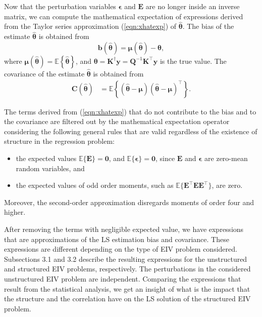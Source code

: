 Now that the perturbation variables $\bm{\epsilon}$ and $\mathbf{E}$ are no longer inside an inverse matrix, we can compute the mathematical expectation of expressions derived from the Taylor series approximation (\ref{eqn:xhatexp}) of $\widehat{\bm{\theta}}$. 
The bias of the estimate $\widehat{\bm{\theta}}$ is obtained from
\begin{equation} \mathbf{b} \left(\widehat{\bm{\theta}} \right) = \bm{\mu}\left(\widehat{\bm{\theta}} \right) - \bm{\theta}, \label{eqn:biasdef} \end{equation}
where $\bm{\mu} \left(\widehat{\bm{\theta}} \right) = \mathbb{E} \left\{ \widehat{\bm{\theta}} \right\}$, and $\bm{\theta} = \mathbf{K}^\dagger \mathbf{y} = \mathbf{Q}^{-1} \mathbf{K}^\top \mathbf{y}$ is the true value.
The covariance of the estimate $\widehat{\bm{\theta}}$ is obtained from
\begin{equation} \begin{aligned} \mathbf{C} \left( \widehat{\bm{\theta}} \right) & = \mathbb{E} \left\{ \left( \widehat{\bm{\theta}} - \bm{\mu} \right) \left( \widehat{\bm{\theta}} - \bm{\mu} \right)^\top \right\} . \end{aligned} \label{eqn:covdef} \end{equation} 

The terms derived from (\ref{eqn:xhatexp}) that do not contribute to the bias and to the covariance are filtered out by the mathematical expectation operator considering the following general rules that are valid regardless of the existence of structure in the regression problem: 
\begin{itemize}
	\item the expected values $\mathbb{E} \{ \mathbf{E} \} = \mathbf{0}$, and $\mathbb{E} \{ \bm{\epsilon} \} = \mathbf{0}$, since $\mathbf{E}$ and $\bm{\epsilon}$ are zero-mean random variables, and
	\item the expected values of odd order moments, such as $\mathbb{E} \{ \mathbf{E}^\top \mathbf{E} \mathbf{E}^\top \}$, are zero.
\end{itemize}
Moreover, the second-order approximation disregards moments of order four and higher.

After removing the terms with negligible expected value, we have expressions that are approximations of the LS estimation bias and covariance. 
These expressions are different depending on the type of EIV problem considered.
Subsections 3.1 and 3.2 describe the resulting expressions for the unstructured and structured EIV problems, respectively.
The perturbations in the considered unstructured EIV problem are independent.
Comparing the expressions that result from the statistical analysis, we get an insight of what is the impact that the structure and the correlation have on the LS solution of the structured EIV problem.

